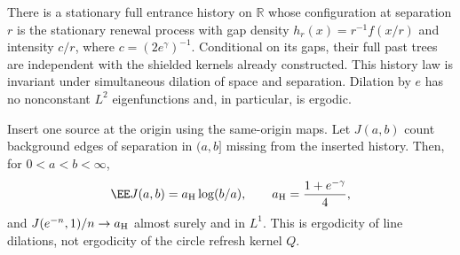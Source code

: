 \documentclass[11pt,letterpaper]{article}
\begin{document}
\begin{lemma}
\label{lem:line-entrance-dilation}
There is a stationary full entrance history on $\mathbb R$ whose
configuration at separation $r$ is the stationary renewal process
with gap density $h_r(x)=r^{-1}f(x/r)$ and intensity $c/r$,
where $c=(2e^\gamma)^{-1}$. Conditional on its gaps, their full past
trees are independent with the shielded kernels already constructed.
This history law is invariant under simultaneous dilation of space
and separation. Dilation by $e$ has no nonconstant $L^2$
eigenfunctions and, in particular, is ergodic.

Insert one source at the origin using the same-origin maps.
Let $J(a,b)$ count background edges of separation in $(a,b]$ missing
from the inserted history. Then, for $0<a<b<\infty$,
\begin{equation}\label{eq:line-capture-mean}
 \EE J(a,b)=a_{\rm H}\log(b/a),\qquad
 a_{\rm H}=\frac{1+e^{-\gamma}}4,
\end{equation}
and $J(e^{-n},1)/n\to a_{\rm H}$ almost surely and in $L^1$.
This is ergodicity of line dilations, not ergodicity of the circle
refresh kernel $Q$.
\end{lemma}
\end{document}
